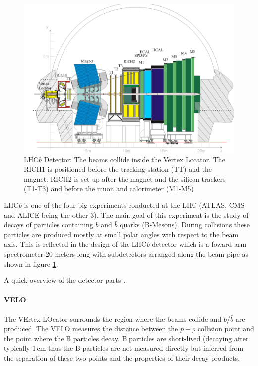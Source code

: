 \documentclass[11pt,twoside]{scrreprt}
\begin{document}
\begin{figure}[tb]
  \centering
  \includegraphics[width=\textwidth]{pics/lhcb_detector}
  \caption{LHC\textit{b} Detector: The beams collide inside the Vertex Locator. The RICH1 is positioned before the tracking station (TT) and
  the magnet. RICH2 is set up after the magnet and the silicon trackers (T1-T3) and before the muon and calorimeter (M1-M5)}
  \label{fig:lhcb}
\end{figure}

LHC\textit{b} is one of the four big experiments conducted at the LHC (ATLAS, CMS and ALICE being the other 3). The main goal of this 
experiment is the study of decays of particles containing $b$ and $\bar{b}$ quarks (B-Mesons). During collisions these particles 
are produced mostly at small polar angles with respect to the beam axis. This is reflected in the design of the LHC\textit{b} detector 
which is a foward arm spectrometer 20 meters long with subdetectors arranged along the beam pipe as shown in figure \ref{fig:lhcb}.

A quick overview of the detector parts \parencite{lhcbweb}.

\paragraph{VELO} The VErtex LOcator surrounds the region where the beams collide and $b$/$\bar{b}$ are produced. The VELO measures the 
distance between the $p-p$ collision point and the point where the B particles decay. B particles are short-lived (decaying after typically
$1$\,cm thus the B particles are not measured directly but inferred from the separation of these two points and the properties of 
their decay products.
\end{document}
